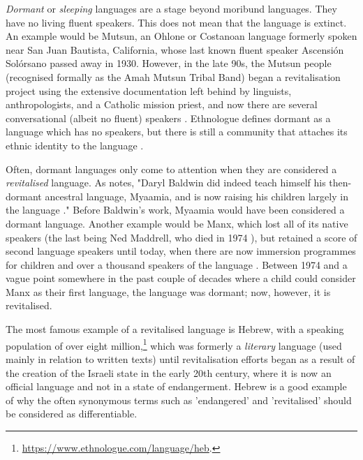 \emph{Dormant} or \textit{sleeping} languages are a stage beyond moribund languages. They have no living fluent speakers. This does not mean that the language is extinct. An example would be Mutsun, an Ohlone or Costanoan language formerly spoken near San Juan Bautista, California, whose last known fluent speaker Ascensi\'on Sol\'orsano passed away in 1930. However, in the late 90s, the Mutsun people (recognised formally as the Amah Mutsun Tribal Band) began a revitalisation project using the extensive documentation left behind by linguists, anthropologists, and a Catholic mission priest, and now there are several conversational (albeit no fluent) speakers \citep{warner2007ethics}. Ethnologue defines dormant as a language which has no speakers, but there is still a community that attaches its ethnic identity to the language \citep{lewis2010assessing}.

Often, dormant languages only come to attention when they are considered a \textit{revitalised} language. As \citet{warner2007ethics} notes, "Daryl Baldwin did indeed teach himself his then-dormant ancestral language, Myaamia, and is now raising his children largely in the language \citep{hinton2001sleeping, leonard2004acquisition}." Before Baldwin's work, Myaamia would have been considered a dormant language. Another example would be Manx, which lost all of its native speakers (the last being Ned Maddrell, who died in 1974 \citep{wilson2008revitalization}), but retained a score of second language speakers until today, when there are now immersion programmes for children and over a thousand speakers of the language \citep{clague2009manx}. Between 1974 and a vague point somewhere in the past couple of decades where a child could consider Manx as their first language, the language was dormant; now, however, it is revitalised.

The most famous example of a revitalised language is Hebrew, with a speaking population of over eight million,\footnote{\href{https://www.ethnologue.com/language/heb}{https://www.ethnologue.com/language/heb}. } which was formerly a {\it literary} language (used mainly in relation to written texts) until revitalisation efforts began as a result of the creation of the Israeli state in the early 20th century, where it is now an official language and not in a state of endangerment. Hebrew is a good example of why the often synonymous terms such as 'endangered' and 'revitalised' should be considered as differentiable.

